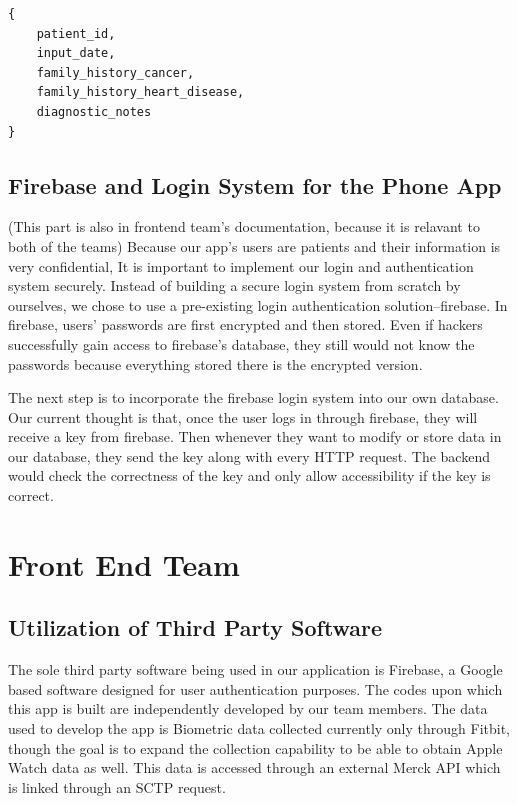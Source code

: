 \documentclass[]{book}
\begin{document}
\begin{verbatim}
{
    patient_id,
    input_date,
    family_history_cancer,
    family_history_heart_disease,
    diagnostic_notes
}
\end{verbatim}

\hypertarget{firebase-and-login-system-for-the-phone-app}{%
\section{Firebase and Login System for the Phone App}\label{firebase-and-login-system-for-the-phone-app}}

(This part is also in frontend team's documentation, because it is relavant to both of the teams)
Because our app's users are patients and their information is very confidential, It is important to implement our login and authentication system securely. Instead of building a secure login system from scratch by ourselves, we chose to use a pre-existing login authentication solution--firebase. In firebase, users' passwords are first encrypted and then stored. Even if hackers successfully gain access to firebase's database, they still would not know the passwords because everything stored there is the encrypted version.

The next step is to incorporate the firebase login system into our own database. Our current thought is that, once the user logs in through firebase, they will receive a key from firebase. Then whenever they want to modify or store data in our database, they send the key along with every HTTP request. The backend would check the correctness of the key and only allow accessibility if the key is correct.

\hypertarget{front-end-team}{%
\chapter{Front End Team}\label{front-end-team}}

\hypertarget{utilization-of-third-party-software}{%
\section{Utilization of Third Party Software}\label{utilization-of-third-party-software}}

The sole third party software being used in our application is Firebase, a Google based software designed for user authentication purposes. The codes upon which this app is built are independently developed by our team members. The data used to develop the app is Biometric data collected currently only through Fitbit, though the goal is to expand the collection capability to be able to obtain Apple Watch data as well. This data is accessed through an external Merck API which is linked through an SCTP request.
\end{document}
